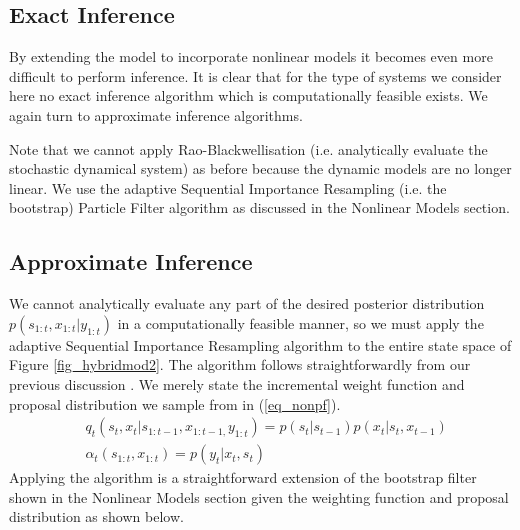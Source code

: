 \subsection{Exact Inference}
By extending the model to incorporate nonlinear models it becomes even more difficult to perform inference. It is clear that for the type of systems we consider here no exact inference algorithm which is computationally feasible exists. We again turn to approximate inference algorithms.

Note that we cannot apply Rao-Blackwellisation (i.e. analytically evaluate the stochastic dynamical system) as before because the dynamic models are no longer linear. We use the adaptive Sequential Importance Resampling (i.e. the bootstrap) Particle Filter algorithm as discussed in the Nonlinear Models section.

\subsection{Approximate Inference}
We cannot analytically evaluate any part of the desired posterior distribution $p(s_{1:t}, x_{1:t}|y_{1:t})$ in a computationally feasible manner, so we must apply the adaptive Sequential Importance Resampling algorithm to the entire state space of Figure \ref{fig_hybridmod2}. The algorithm follows straightforwardly from our previous discussion \cite{murphy1}. We merely state the incremental weight function and proposal distribution we sample from in (\ref{eq_nonpf}). 
\begin{equation}
\begin{aligned}
&q_t(s_t,x_t|s_{1:t-1},x_{1:t-1,}y_{1:t}) = p(s_t|s_{t-1})p(x_t|s_t,x_{t-1}) \\
&\alpha_t(s_{1:t},x_{1:t}) = p(y_t|x_t,s_t)
\end{aligned}
\label{eq_nonpf}
\end{equation}  
Applying the algorithm is a straightforward extension of the bootstrap filter shown in the Nonlinear Models section given the weighting function and proposal distribution as shown below.

